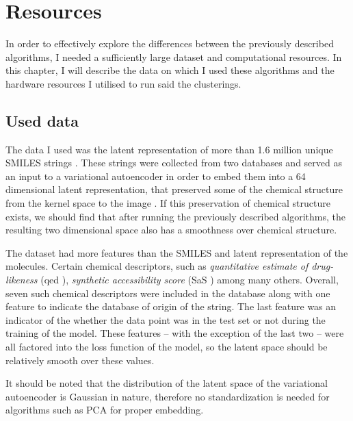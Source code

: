 \chapter{Resources}\label{ch:resources}

In order to effectively explore the differences between the previously described algorithms, I needed a sufficiently large dataset and computational resources. In this chapter, I will describe the data on which I used these algorithms and the hardware resources I utilised to run said the clusterings.

\section{Used data}\label{sec:used-data}

The data I used was the latent representation of more than 1.6 million unique SMILES strings \cite{bib:smiles}. These strings were collected from two databases and served as an input to a variational autoencoder in order to embed them into a 64 dimensional latent representation, that preserved some of the chemical structure from the kernel space to the image \cite{bib:thesis}. If this preservation of chemical structure exists, we should find that after running the previously described algorithms, the resulting two dimensional space also has a smoothness over chemical structure.

The dataset had more features than the SMILES and latent representation of the molecules. Certain chemical descriptors, such as \textit{quantitative estimate of drug-likeness} (qed \cite{bib:qed}), \textit{synthetic accessibility score} (SaS \cite{bib:sas}) among many others. Overall, seven such chemical descriptors were included in the database along with one feature to indicate the database of origin of the string. The last feature was an indicator of the whether the data point was in the test set or not during the training of the model. These features -- with the exception of the last two -- were all factored into the loss function of the model, so the latent space should be relatively smooth over these values.

It should be noted that the distribution of the latent space of the variational autoencoder is Gaussian in nature, therefore no standardization is needed for algorithms such as PCA for proper embedding.

